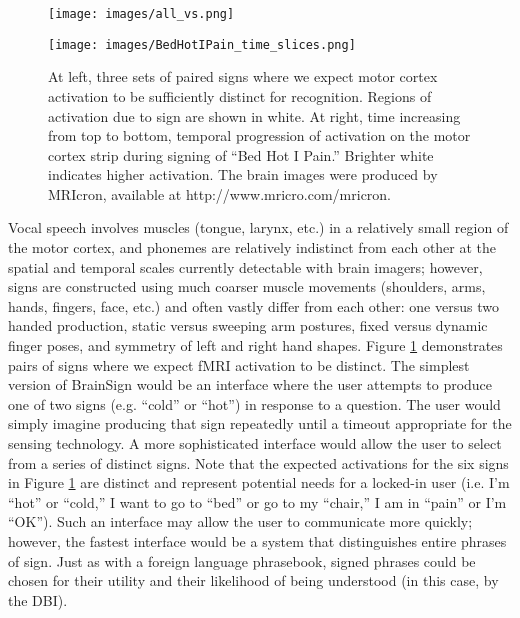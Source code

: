 \documentclass{proposal}
\begin{document}
\begin{figure}[ht]
\begin{minipage}[t]{120mm}
\begin{center}
\texttt{[image: images/all\_vs.png]}
\end{center}
\end{minipage}
\hfill
\begin{minipage}[t]{35mm}
\begin{center}
\texttt{[image: images/BedHotIPain\_time\_slices.png]}
\end{center}
\end{minipage}
\caption{\label{fig:brainsign} At left, three sets of paired signs where we expect motor cortex activation to be sufficiently distinct for recognition. Regions of activation due to sign are shown in white. At right, time increasing from top to bottom, temporal progression of activation on the motor cortex strip during signing of ``Bed Hot I Pain.'' Brighter white indicates higher activation. The brain images were produced by MRIcron, available at http://www.mricro.com/mricron.}
\end{figure}


Vocal speech involves muscles (tongue, larynx, etc.) in a relatively small region of the motor cortex, and phonemes are relatively indistinct from each other at the spatial and temporal scales currently detectable with brain imagers; however, signs are constructed using much coarser muscle movements (shoulders, arms, hands, fingers, face, etc.) and often vastly differ from each other: one versus two handed production, static versus sweeping arm postures, fixed versus dynamic finger poses, and symmetry of left and right hand shapes.  Figure \ref{fig:brainsign} demonstrates pairs of signs where we expect
fMRI activation
to be distinct.  The simplest version of BrainSign would be an interface where the user attempts to produce one of two signs (e.g. ``cold'' or ``hot'') in response to a question.  The user would simply imagine producing that sign repeatedly until a timeout appropriate for the sensing technology.  A more sophisticated interface would allow the user to select from a series of distinct signs.  Note that the expected
activations %
for the six signs in Figure \ref{fig:brainsign} are distinct and represent potential needs for a locked-in user (i.e. I'm ``hot'' or ``cold,'' I want to go to ``bed'' or go to my ``chair,'' I am in ``pain'' or I'm ``OK'').  Such an interface may allow the user to communicate more quickly; however, the fastest interface would be a system that distinguishes entire phrases of sign. Just as with a foreign language phrasebook, signed phrases could be chosen for their utility and their likelihood of being understood (in this case, by the DBI).
\end{document}
